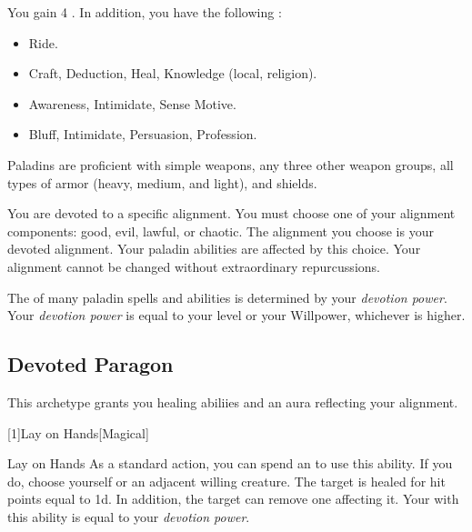         You gain 4 .
        In addition, you have the following :
        \begin{itemize}
            \item {} Ride.
            \item {} Craft, Deduction, Heal, Knowledge (local, religion).
            \item {} Awareness, Intimidate, Sense Motive.
            \item {} Bluff, Intimidate, Persuasion, Profession.
        \end{itemize}

        Paladins are proficient with simple weapons, any three other weapon groups, all types of armor (heavy, medium, and light), and shields.

        You are devoted to a specific alignment.
        You must choose one of your alignment components: good, evil, lawful, or chaotic.
        The alignment you choose is your devoted alignment.
        Your paladin abilities are affected by this choice.
        Your alignment cannot be changed without extraordinary repurcussions.

        The  of many paladin spells and abilities is determined by your \textit{devotion power}.
        Your \textit{devotion power} is equal to your level or your Willpower, whichever is higher.

    \subsection{Devoted Paragon}
        This archetype grants you healing abiliies and an aura reflecting your alignment.

        [1]{Lay on Hands}[Magical]
        \begin{ability}{Lay on Hands}
            As a standard action, you can spend an  to use this ability.
            If you do, choose yourself or an adjacent willing creature.
            The target is healed for hit points equal to  \plus1d.
            In addition, the target can remove one  affecting it.
            Your  with this ability is equal to your \textit{devotion power}.
        \end{ability}

